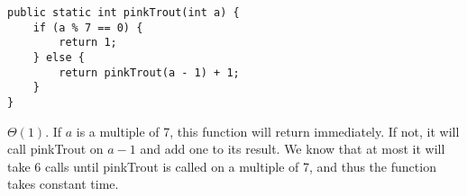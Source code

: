 \begin{blocksection}
\question
\begin{lstlisting}
public static int pinkTrout(int a) {
    if (a % 7 == 0) {
        return 1;
    } else {
        return pinkTrout(a - 1) + 1;
    }
}
\end{lstlisting}

\begin{solution}
$\Theta(1)$. If $a$ is a multiple of 7, this function will return immediately. If not, it will call pinkTrout on $a-1$ and add one to its result. We know that at most it will take 6 calls until pinkTrout is called on a multiple of 7, and thus the function takes constant time. 
\end{solution}
\end{blocksection}
